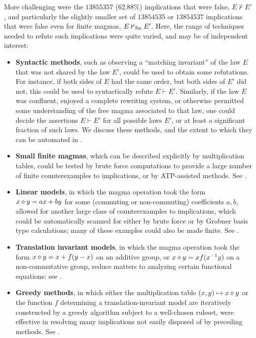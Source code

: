 More challenging were the $\num{13855357}$ ($62.88\%$) implications that were false, $E \nvdash E'$, and particularly the slightly smaller set of $\num{13854535}$ or $\num{13854537}$ implications that were false even for finite magmas, $E \nvdash_{\mathrm{fin}} E'$. Here, the range of techniques needed to refute such implications were quite varied, and may be of independent interest:
\begin{itemize}
        \item \textbf{Syntactic methods}, such as observing a ``matching invariant'' of the law $E$ that was not shared by the law $E'$, could be used to obtain some refutations.  For instance, if both sides of $E$ had the same order, but both sides of $E'$ did not, this could be used to syntactically refute $E \vdash E'$.  Similarly, if the law $E$ was confluent, enjoyed a complete rewriting system, or otherwise permitted some understanding of the free magma associated to that law, one could decide the assertions $E \vdash E'$ for all possible laws $E'$, or at least a significant fraction of such laws.  We discuss these methods, and the extent to which they can be automated in .
        \item \textbf{Small finite magmas}, which can be described explicitly by multiplication tables, could be tested by brute force computations to provide a large number of finite counterexamples to implications, or by ATP-assisted methods. See .
        \item \textbf{Linear models}, in which the magma operation took the form $x \diamond y = ax + by$ for some (commuting or non-commuting) coefficients $a,b$, allowed for another large class of counterexamples to implications, which could be automatically scanned for either by brute force or by Grobner basis type calculations; many of these examples could also be made finite. See .
        \item \textbf{Translation invariant models}, in which the magma operation took the form $x \diamond y = x + f(y-x)$ on an additive group, or $x \diamond y = x f(x^{-1} y)$ on a non-commutative group, reduce matters to analyzing certain functional equations; see .
        \item \textbf{Greedy methods}, in which either the multiplication table $(x,y) \mapsto x \diamond y$ or the function $f$ determining a translation-invariant model are iteratively constructed by a greedy algorithm subject to a well-chosen ruleset, were effective in resolving many implications not easily disposed of by preceding methods. See .

\end{itemize}
